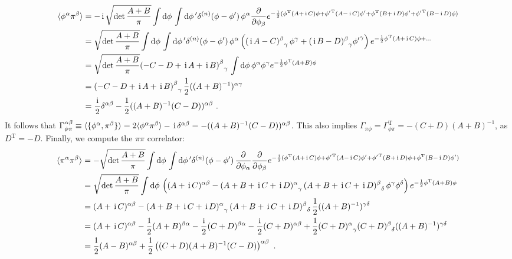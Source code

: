 \documentclass[letter]{article}
\renewcommand{\i}{\,\ensuremath\mathrm{i\,}}
\newcommand{\intd}[1]{\int\mathrm{d}#1\,}
\begin{document}
\begin{align}
\langle \phi^\alpha \pi^\beta \rangle &= -\i \sqrt{\det\frac{A+B}{\pi}} \intd\phi \intd\phi^\prime  \delta^{(n)}(\phi - \phi^\prime)\, \phi^\alpha \frac{\partial}{\partial\phi_\beta} e^{ -\frac{1}{2} (\phi^\mathrm{T} (A+\i C) \phi + {\phi^\prime}^\mathrm{T} (A-\i C) \phi^\prime + \phi^\mathrm{T} (B+\i D) \phi^\prime  + {\phi^\prime}^\mathrm{T} (B-\i D) \phi) } \nonumber\\
&= \sqrt{\det\frac{A+B}{\pi}} \intd\phi \intd\phi^\prime  \delta^{(n)}(\phi - \phi^\prime)\, \phi^\alpha \left( {(\i A-C)^\beta}_\gamma\,\phi^\gamma + {(\i B - D)^\beta}_\gamma {\phi^\prime}^\gamma \right) e^{ -\frac{1}{2} \phi^\mathrm{T} (A+\i C) \phi + \dots } \nonumber\\
&= \sqrt{\det\frac{A+B}{\pi}} {\left( -C - D + \i A + \i B \right)^\beta}_\gamma\, \intd\phi \phi^\alpha \phi^\gamma e^{ -\frac{1}{2} \phi^\mathrm{T} (A+B) \phi } \nonumber\\
&= {\left( -C - D + \i A + \i B \right)^\beta}_\gamma\, \frac{1}{2} ((A+B)^{-1})^{\alpha\gamma} \nonumber\\
&= \frac{\i}{2} \delta^{\alpha\beta} - \frac{1}{2} ((A+B)^{-1}(C-D))^{\alpha\beta}\ .
\end{align}
It follows that $\Gamma^{\alpha\beta}_{\phi\pi} \equiv \langle \{ \phi^\alpha, \pi^\beta \} \rangle = 2 \langle \phi^\alpha\pi^\beta \rangle - \i\delta^{\alpha\beta} = -((A+B)^{-1}(C-D))^{\alpha\beta}$. This also implies $\Gamma_{\pi\phi} = \Gamma_{\phi\pi}^\mathrm{T} = -(C+D) (A+B)^{-1}$, as $D^\mathrm{T}=-D$.
Finally, we compute the $\pi\pi$ correlator:
\begin{align}
\langle \pi^\alpha \pi^\beta \rangle &= - \sqrt{\det\frac{A+B}{\pi}} \intd\phi \intd\phi^\prime  \delta^{(n)}(\phi - \phi^\prime)\,\frac{\partial}{\partial\phi_\alpha}\frac{\partial}{\partial\phi_\beta} e^{ -\frac{1}{2} (\phi^\mathrm{T} (A+\i C) \phi + {\phi^\prime}^\mathrm{T} (A-\i C) \phi^\prime + {\phi^\prime}^\mathrm{T} (B+\i D) \phi + \phi^\mathrm{T} (B-\i D) \phi^\prime ) } \nonumber\\
&= \sqrt{\det\frac{A+B}{\pi}} \intd\phi \left( (A+\i C)^{\alpha\beta} - {(A+B + \i C + \i D)^\alpha}_\gamma\, {(A+B + \i C + \i D)^\beta}_\delta\, \phi^\gamma \phi^\delta \right) e^{ -\frac{1}{2} \phi^\mathrm{T} (A+B) \phi } \nonumber\\
&= (A+\i C)^{\alpha\beta} - {(A+B + \i C + \i D)^\alpha}_\gamma\, {(A+B+ \i C + \i D)^\beta}_\delta\, \frac{1}{2} ((A+B)^{-1})^{\gamma\delta} \nonumber\\
&= (A+\i C)^{\alpha\beta} - \frac{1}{2} (A+B)^{\beta\alpha} - \frac{\i}{2}(C+D)^{\beta\alpha} - \frac{\i}{2} (C+D)^{\alpha\beta} + \frac{1}{2} {(C+D)^\alpha}_\gamma {(C+D)^\beta}_\delta ((A+B)^{-1})^{\gamma\delta} \nonumber\\
&= \frac{1}{2}(A - B)^{\alpha\beta} + \frac{1}{2} \left( (C+D)(A+B)^{-1}(C-D) \right)^{\alpha\beta}\ .
\end{align}
\end{document}
